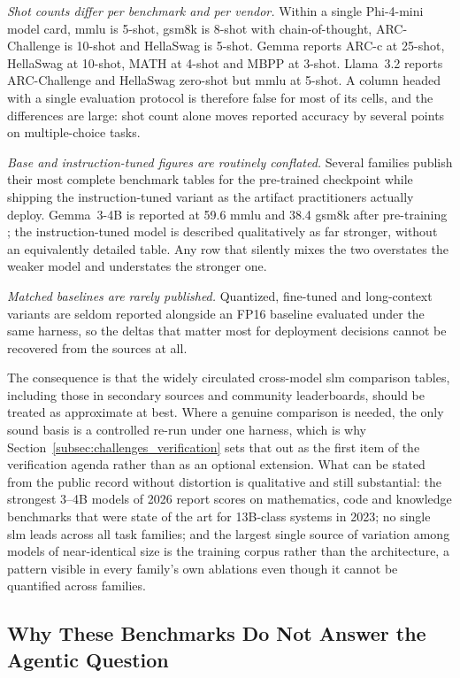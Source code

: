 \emph{Shot counts differ per benchmark and per vendor.} Within a single Phi-4-mini
model card, \gls{mmlu} is 5-shot, \gls{gsm8k} is 8-shot with chain-of-thought,
ARC-Challenge is 10-shot and HellaSwag is 5-shot. Gemma reports ARC-c at 25-shot,
HellaSwag at 10-shot, MATH at 4-shot and MBPP at 3-shot. Llama~3.2 reports
ARC-Challenge and HellaSwag zero-shot but \gls{mmlu} at 5-shot. A column headed
with a single evaluation protocol is therefore false for most of its cells, and
the differences are large: shot count alone moves reported accuracy by several
points on multiple-choice tasks.

\emph{Base and instruction-tuned figures are routinely conflated.} Several
families publish their most complete benchmark tables for the pre-trained
checkpoint while shipping the instruction-tuned variant as the artifact
practitioners actually deploy. Gemma~3-4B is reported at 59.6 \gls{mmlu} and 38.4
\gls{gsm8k} after pre-training \citep{team2025gemma3}; the instruction-tuned model
is described qualitatively as far stronger, without an equivalently detailed
table. Any row that silently mixes the two overstates the weaker model and
understates the stronger one.

\emph{Matched baselines are rarely published.} Quantized, fine-tuned and
long-context variants are seldom reported alongside an FP16 baseline evaluated
under the same harness, so the deltas that matter most for deployment decisions
cannot be recovered from the sources at all.

The consequence is that the widely circulated cross-model \gls{slm} comparison
tables, including those in secondary sources and community leaderboards, should
be treated as approximate at best. Where a genuine comparison is needed, the only
sound basis is a controlled re-run under one harness, which is why
Section~\ref{subsec:challenges_verification} sets that out as the first item of
the verification agenda rather than as an optional extension. What can be stated
from the public record without distortion is qualitative and still substantial:
the strongest 3--4B models of 2026 report scores on mathematics, code and
knowledge benchmarks that were state of the art for 13B-class systems in 2023;
no single \gls{slm} leads across all task families; and the largest single source
of variation among models of near-identical size is the training corpus rather
than the architecture, a pattern visible in every family's own ablations even
though it cannot be quantified across families.

\subsection{Why These Benchmarks Do Not Answer the Agentic Question}
\label{subsec:reported_agentic_gap}


